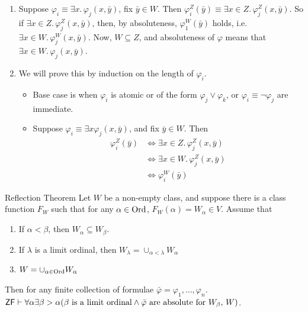 \documentclass{article}
\begin{document}
\begin{enumerate}
    \item[(i) $\Rightarrow$ (ii)] Suppose $\varphi_{i} \equiv \exists x. \, \varphi_{j}(x,\bar{y})$, fix $\bar{y} \in W$. Then $\varphi_{i}^{Z}(\bar{y}) \equiv \exists x \in Z. \, \varphi_{j}^{Z}(x, \bar{y})$. So if $\exists x \in Z. \, \varphi_{j}^{Z}(x, \bar{y})$, then, by absoluteness, $\varphi_{1}^{W}(\bar{y})$ holds, i.e. $\exists x \in W. \, \varphi_{j}^{W}(x, \bar{y})$.\gap
          Now, $W \subseteq Z$, and absoluteness of $\varphi$ means that $ \exists x \in W. \, \varphi_{j}(x, \bar{y})$.
    \item[(ii) $\Rightarrow$ (i)] We will prove this by induction on the length of $\varphi_{i}$. \begin{itemize}
              \item Base case is when $\varphi_{i}$ is atomic or of the form $\varphi_{j} \vee \varphi_{k}$, or $\varphi_{i} \equiv \neg \varphi_{j}$ are immediate.
              \item Suppose $\varphi_{i} \equiv \exists x \varphi_{j}(x, \bar{y})$, and fix $\bar{y} \in W$. Then \begin{align*}
                        \varphi_{i}^{Z}(\bar{y}) & \Leftrightarrow \exists x \in Z. \, \varphi_{j}^{Z}(x, \bar{y})                                                             \\
                                                 & \Leftrightarrow \exists x \in W.\, \varphi_{j}^{Z}(x, \bar{y}) \tag{$\Rightarrow$ assumption, $\Leftarrow$, $W\subseteq Z$} \\
                                                 & \Leftrightarrow \varphi_{i}^{W}(\bar{y})
                    \end{align*}
          \end{itemize}
\end{enumerate}
\endproof
\newlec
\begin{fancythm}{Reflection Theorem}
    Let $W$ be a non-empty class, and suppose there is a class function $F_{W}$ such that for any $\alpha \in \operatorname{Ord}$, $F_{W}(\alpha) = W_{\alpha} \in V$. Assume that \begin{enumerate}
        \item[(i)] If $\alpha < \beta$, then $W_{\alpha} \subseteq W_{\beta}$.
        \item[(ii)] If $\lambda$ is a limit ordinal, then $W_{\lambda} = \cup_{\alpha<\lambda} W_{\alpha}$
        \item[(iii)] $W = \cup_{\alpha \in \operatorname{Ord}} W_{\alpha}$
    \end{enumerate}
    Then for any finite collection of formulae $\bar{\varphi} = \varphi_{1}, \dots, \varphi_{n}$. $\mathsf{ZF} \vdash \forall \alpha \exists \beta>\alpha (\beta \text{ is a limit ordinal} \wedge \bar{\varphi} \text{ are absolute for } W_{\beta}, \,W)$.
\end{fancythm}
\end{document}

